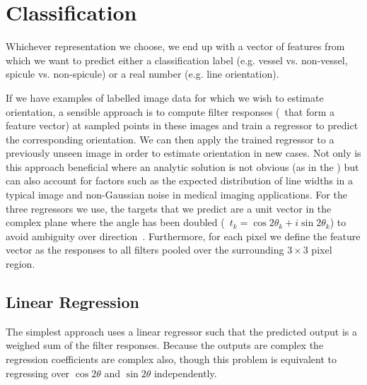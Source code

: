 \section{Classification}
Whichever representation we choose, we end up with a vector of features from which we want to predict either a classification label (e.g. vessel vs. non-vessel, spicule vs. non-spicule) or a real number (e.g. line orientation).


If we have examples of labelled image data for which we wish to estimate orientation, a sensible approach is to compute filter responses (\ie~that form a feature vector) at sampled points in these images and train a regressor to predict the corresponding orientation. We can then apply the trained regressor to a previously unseen image in order to estimate orientation in new cases. Not only is this approach beneficial where an analytic solution is not obvious (as in the \dtcwt{}) but can also account for factors such as the expected distribution of line widths in a typical image and non-Gaussian noise in medical imaging applications. For the three regressors we use, the targets that we predict are a unit vector in the complex plane where the angle has been doubled (\ie~$t_k = \cos 2\theta_k + i\sin 2\theta_k$) to avoid ambiguity over direction~\cite{Mardia_Jupp_00}. Furthermore, for each pixel we define the feature vector as the responses to all filters pooled over the surrounding $3{\times}3$ pixel region.


\subsection{Linear Regression}
\label{s:learning_linear}
The simplest approach uses a linear regressor such that the predicted output is a weighed sum of the filter responses. Because the outputs are complex the regression coefficients are complex also, though this problem is equivalent to regressing over $\cos 2\theta$ and $\sin 2\theta$ independently.



